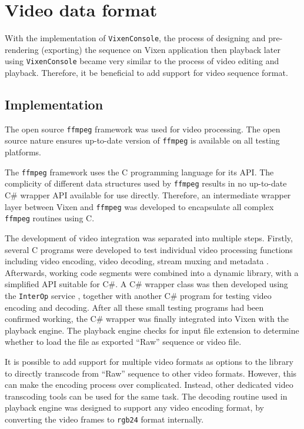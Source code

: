 \section{Video data format}

With the implementation of \texttt{VixenConsole}, the process of designing and pre-rendering (exporting) the sequence on Vixen application then playback later using \texttt{VixenConsole} became very similar to the process of video editing and playback. Therefore, it  be beneficial to add support for video sequence format.

\subsection{Implementation}

The open source \texttt{ffmpeg} framework \cite{ffmpeg} was used for video processing. The open source nature ensures up-to-date version of \texttt{ffmpeg} is available on all testing platforms.

The \texttt{ffmpeg} framework uses the C programming language for its API. The complicity of different data structures used by \texttt{ffmpeg} results in no up-to-date C\# wrapper API available for use directly. Therefore, an intermediate wrapper layer between Vixen and \texttt{ffmpeg} was developed to encapsulate all complex \texttt{ffmpeg} routines using C.

The development of video integration was separated into multiple steps. Firstly, several C programs were developed to test individual video processing functions including video encoding, video decoding, stream muxing and metadata . Afterwards, working code segments were combined into a dynamic library, with a simplified API suitable for C\#. A C\# wrapper class was then developed using the \texttt{InterOp} service \cite{interop}, together with another C\# program for testing video encoding and decoding. After all these small testing programs had been confirmed working, the C\# wrapper was finally integrated into Vixen with the playback engine. The playback engine checks for  input file extension to determine whether to load the file as  exported ``Raw'' sequence or  video file.

 It is possible to add support for multiple video formats as options to the  library to directly transcode from ``Raw'' sequence to other video formats. However, this can make the encoding process  over complicated. Instead, other dedicated video transcoding tools can be used for the same task. The decoding routine used in playback engine was designed to support any video encoding format, by converting the video frames to \texttt{rgb24} format internally.

